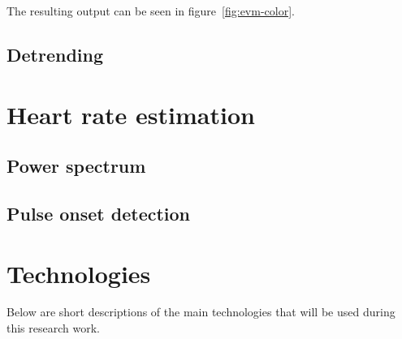 The resulting output can be seen in figure~\ref{fig:evm-color}.

\subsection{Detrending} \label{sec:sota:post:detrend}


\section{Heart rate estimation} \label{sec:sota:estimation}


\subsection{Power spectrum} \label{sec:sota:estimation:power}


\subsection{Pulse onset detection} \label{sec:sota:estimation:pulse}


\section{Technologies} \label{sec:sota:tech}


Below are short descriptions of the main technologies that will be
used during this research work.

